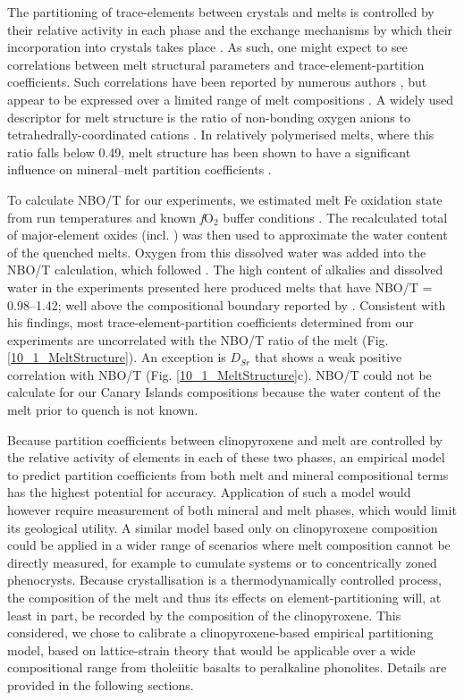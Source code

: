 \documentclass[review,authoryear,12pt]{elsarticle}
\newcommand{\fO}{\textit{f}O$_{2}$ }
\begin{document}
The partitioning of trace-elements between crystals and melts is controlled by their relative activity in each phase and the exchange mechanisms by which their incorporation into crystals takes place \citep[e.g., Jd-melt, Jd-DiHd and CaTS-DiHd exchanges have been shown to control REE incorporation in cpx, ][]{Putirka2008,Wood2014,Mollo2017}. As such, one might expect to see correlations between melt structural parameters and trace-element-partition coefficients. Such correlations have been reported by numerous authors \citep[e.g.,][]{Schmidt2006,Mollo2017}, but appear to be expressed over a limited range of melt compositions \citep{Gaetani2004,Huang2006}. A widely used descriptor for melt structure is the ratio of non-bonding oxygen anions to tetrahedrally-coordinated cations \citep[$\frac{NBO}{T}$,][]{Mysen1982,Mysen1985}. In relatively polymerised melts, where this ratio falls below 0.49, melt structure has been shown to have a significant influence on mineral--melt partition coefficients \citep{Gaetani2004,Huang2006}. 
    
    To calculate NBO/T for our experiments, we estimated melt Fe oxidation state from run temperatures and known \fO buffer conditions \citep{Kress1991}. The recalculated total of major-element oxides (incl. ) was then used to approximate the water content of the quenched melts. Oxygen from this dissolved water was added into the NBO/T calculation, which followed \citet{Mysen1985}. The high content of alkalies and dissolved water in the experiments presented here produced melts that have NBO/T = 0.98--1.42; well above the compositional boundary reported by \citet[][]{Gaetani2004}. 
Consistent with his findings, most trace-element-partition coefficients determined from our experiments are uncorrelated with the NBO/T ratio of the melt (Fig. \ref{10_1_MeltStructure}). An exception is $D_{Sr}$ that shows a weak positive correlation with NBO/T (Fig. \ref{10_1_MeltStructure}c). NBO/T could not be calculate for our Canary Islands compositions because the water content of the melt prior to quench is not known.

Because partition coefficients between clinopyroxene and melt are controlled by the relative activity of elements in each of these two phases, an empirical model to predict partition coefficients from both melt and mineral compositional terms has the highest potential for accuracy. Application of such a model would however require measurement of both mineral and melt phases, which would limit its geological utility. 
    A similar model based only on clinopyroxene composition could be applied in a wider range of scenarios where melt composition cannot be directly measured, for example to cumulate systems or to concentrically zoned phenocrysts.
Because crystallisation is a thermodynamically controlled process, the composition of the melt and thus its effects on element-partitioning will, at least in part, be recorded by the composition of the clinopyroxene. This considered, we chose to calibrate a clinopyroxene-based empirical partitioning model, based on lattice-strain theory that would be applicable over a wide compositional range from tholeiitic basalts to peralkaline phonolites. Details are provided in the following sections.  
\end{document}
